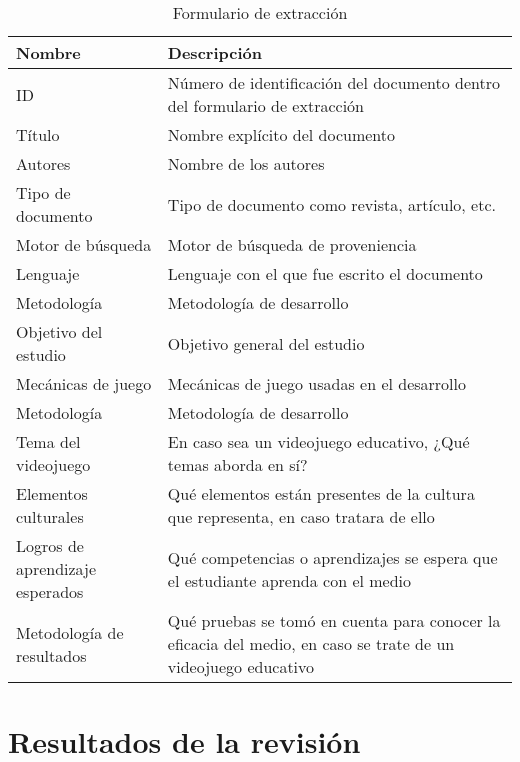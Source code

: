 \begin{table}[H]
    \centering
    \begin{tabularx}{\textwidth}{|X|X|}
        \hline
        Nombre & Descripción \\ \hline
        ID & Número de identificación del documento dentro del formulario de extracción \\ \hline
        Título & Nombre explícito del documento \\ \hline
        Autores & Nombre de los autores \\ \hline
        Tipo de documento & Tipo de documento como revista, artículo, etc. \\ \hline
        Motor de búsqueda & Motor de búsqueda de proveniencia \\ \hline
        Lenguaje & Lenguaje con el que fue escrito el documento \\ \hline
        Metodología & Metodología de desarrollo \\ \hline
        Objetivo del estudio & Objetivo general del estudio \\ \hline
        Mecánicas de juego & Mecánicas de juego usadas en el desarrollo \\ \hline
        Metodología & Metodología de desarrollo \\ \hline
        Tema del videojuego & En caso sea un videojuego educativo, ¿Qué temas aborda en sí? \\ \hline
        Elementos culturales & Qué elementos están presentes de la cultura que representa, en caso tratara de ello \\ \hline
        Logros de aprendizaje esperados & Qué competencias o aprendizajes se espera que el estudiante aprenda con el medio \\ \hline
        Metodología de resultados & Qué pruebas se tomó en cuenta para conocer la eficacia del medio, en caso se trate de un videojuego educativo \\ \hline
        
    \end{tabularx}
    \caption{Formulario de extracción}
    \label{tab:definicion_formulario_de_extraccion}
\end{table}

\section{Resultados de la revisión}

